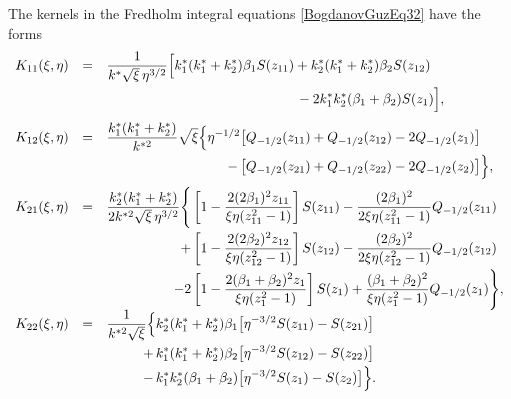 The kernels in the Fredholm integral equations \eqref{BogdanovGuzEq32} have the forms
\begin{equation}
	\label{BogdanovGuzEq34}
	\begin{array}{rcl}
		
		K_{11}(\xi,\eta)
		&=&
		\begin{multlined}[t]
		\frac{1}{k^{*}\sqrt{\xi}\,\eta^{3/2}}
		\Bigl[
		k_{1}^{*}(k_{1}^{*}+k_{2}^{*})\beta_{1}S(z_{11})
		+
		k_{2}^{*}(k_{1}^{*}+k_{2}^{*})\beta_{2}S(z_{12})
		\\[-1em]
		-2k_{1}^{*}k_{2}^{*}(\beta_{1}+\beta_{2})S(z_{1})
		\Bigr],
		\end{multlined}
		\\[3.5em]
		K_{12}(\xi,\eta)
		&=&
		\begin{aligned}[t]
			\dfrac{k_{1}^{*}(k_{1}^{*}+k_{2}^{*})}{k^{*2}}\sqrt{\xi}
			\Bigl\{
			\eta^{-1/2}
			&\bigl[
			Q_{-1/2}(z_{11})+Q_{-1/2}(z_{12})-2Q_{-1/2}(z_{1})
			\bigr]
			\\
			-\,
			&\bigl[
			Q_{-1/2}(z_{21})+Q_{-1/2}(z_{22})-2Q_{-1/2}(z_{2})
			\bigr]
			\Bigr\},
		\end{aligned}
		\\[3em]
		K_{21}(\xi,\eta)
		&=&
		\begin{aligned}[t]
			\dfrac{k_{2}^{*}(k_{1}^{*}+k_{2}^{*})}
			{2k^{*2}\sqrt{\xi}\,\eta^{3/2}}
			\Biggl\{
			&\left[
			1-\frac{2(2\beta_{1})^{2}z_{11}}
			{\xi\eta(z_{11}^{2}-1)}
			\right]S(z_{11})
			-
			\frac{(2\beta_{1})^{2}}
			{2\xi\eta(z_{11}^{2}-1)}
			Q_{-1/2}(z_{11})
			\\
			+
			&\left[
			1-\frac{2(2\beta_{2})^{2}z_{12}}
			{\xi\eta(z_{12}^{2}-1)}
			\right]S(z_{12})
			-
			\frac{(2\beta_{2})^{2}}
			{2\xi\eta(z_{12}^{2}-1)}
			Q_{-1/2}(z_{12})
			\\
			-
			2&\left[
			1-\frac{2(\beta_{1}+\beta_{2})^{2}z_{1}}
			{\xi\eta(z_{1}^{2}-1)}
			\right]S(z_{1})
			+
			\frac{(\beta_{1}+\beta_{2})^{2}}
			{\xi\eta(z_{1}^{2}-1)}
			Q_{-1/2}(z_{1})
			\Biggr\},
		\end{aligned}
		\\
		K_{22}(\xi,\eta)
		&=&
		\begin{aligned}[t]
			\dfrac{1}{k^{*2}\sqrt{\xi}}
			\Bigl\{
			&k_{2}^{*}(k_{1}^{*}+k_{2}^{*})\beta_{1}
			\bigl[\eta^{-3/2}S(z_{11})-S(z_{21})\bigr]
			\\
			+\,
			&k_{1}^{*}(k_{1}^{*}+k_{2}^{*})\beta_{2}
			\bigl[\eta^{-3/2}S(z_{12})-S(z_{22})\bigr]
			\\
			-\,
			&k_{1}^{*}k_{2}^{*}(\beta_{1}+\beta_{2})
			\bigl[\eta^{-3/2}S(z_{1})-S(z_{2})\bigr]
			\Bigr\}.
		\end{aligned}
	\end{array}
\end{equation}
